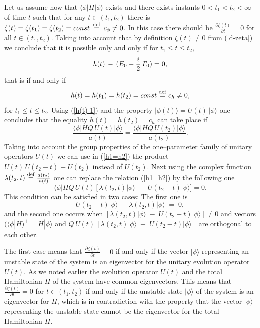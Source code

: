 \documentclass[12pt]{article}
\begin{document}
Let us assume now that $\langle \phi|H|\phi \rangle$ exists and
there exists instants
$0< t_{1} < t_{2} < \infty $ of time $t$  such that for any $t \in (t_{1}, t_{2})$ there is
$\zeta (t) = \zeta (t_{1}) = \zeta (t_{2}) = const \, \stackrel{\rm def}{=} \,c_{\phi} \neq 0 $. In this case there should be $\frac{\partial \zeta (t)}{\partial t} = 0$ for all $t \in (t_{1},t_{2})$.
Taking into account that by definition $\zeta (t) \neq 0$  from (\ref{d-zeta}) we conclude that it is possible only and only if for $t_{1} \leq t \leq t_{2}$,
\begin{equation}
h(t) \, -\, (E_{0} - \frac{i}{2}\,{\it\Gamma}_{0}) = 0,\label{h-E}
\end{equation}
that is if and only if
\begin{equation}
h(t) = h(t_{1}) = h(t_{2}) = const \stackrel{\rm def}{=}  c_{h} \neq 0, \label{h=h1=h2}
\end{equation}
for $t_{1} \leq t \leq t_{2}$. Using  (\ref{h(t)-1}) and the property $|\phi (t) \rangle = U(t)\,|\phi\rangle$ one  concludes that the equality $h(t) = h(t_{2}) = c_{h}$ can take place if
\begin{equation}
\frac{\langle \phi|HQ\,U(t) |\phi \rangle}{a(t)} = \frac{\langle \phi|HQ\,U(t_{2}) |\phi \rangle}{a(t_{2})}. \label{h1=h2}
\end{equation}
Taking into account the group properties of the one--parameter family of unitary operators $U(t)$
we can use in (\ref{h1=h2}) the product $U(t)\,U(t_{2} - t)\equiv U(t_{2})$ instead of $U(t_{2})$. Next using the complex function $\lambda (t_{2},t) \stackrel{\rm def}{=} \frac{a(t_{2})}{a(t)}$ one can replace the relation (\ref{h1=h2})  by the following one
\begin{equation}
\langle \phi |HQ\,U(t)\,\Big[\,\lambda(t_{2},t)|\phi \rangle\;-\;U(t_{2} - t)|\phi\rangle\Big]=0. \label{h1=h2-a}
\end{equation}
This condition can be satisfied in two cases: The first one is
\begin{equation}
U(t_{2} - t)|\phi\rangle \,-\, \lambda(t_{2},t)|\phi \rangle \; =\;0, \label{d-zeta=0-1}
\end{equation}
and the second one occurs when $[\lambda(t_{2},t)|\phi \rangle\;-\;U(t_{2} - t)|\phi\rangle] \neq 0 $ and
vectors $(\langle \phi |H)^{+} = H|\phi\rangle$ and $ Q\,U(t)\,[\lambda(t_{2},t)|\phi \rangle\;-\;U(t_{2} - t)|\phi\rangle] $ are orthogonal to each other.


The first case means that $\frac{\partial \zeta (t)}{\partial t} = 0$ if and only
if the vector $|\phi \rangle$ representing an unstable state of the system is an eigenvector for the unitary evolution operator $U(t)$.  As we noted earlier
the evolution operator $U(t)$ and the total Hamiltonian $H$ of the system have common eigenvectors. This means that $\frac{\partial \zeta (t)}{\partial t} = 0$ for $t \in (t_{1},t_{2})$ if and only if the unstable state $|\phi\rangle$ of the system is an eigenvector for $H$, which is in contradiction with the property that the vector $|\phi\rangle$ representing the  unstable state cannot be the eigenvector for the total Hamiltonian $H$.
\end{document}
